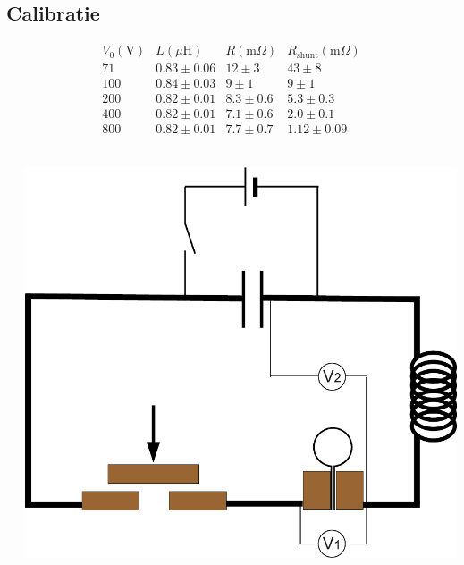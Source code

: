 \documentclass{beamer}
\newcommand{\Rshunt}{R_\mathrm{shunt}}
\newcommand{\includeGraph}[2]{
	\begin{center}
	\scalebox{#1}{
		
	}
	\end{center}
}
\begin{document}
\subsection{Calibratie}
\begin{frame}
\begin{center}
\includeGraph{0.85}{fitI800V}
\end{center}
\end{frame}

\begin{frame}
$$
\begin{array}{c|c|c|c}
V_0 (\mathrm V)&
	L (\mu\mathrm H)&
			R (\mathrm m \Omega)&
				\Rshunt (\mathrm m \Omega)\\\hline
71&	0.83 \pm 0.06&	12 \pm 3&	43 \pm 8\\
100&	0.84 \pm 0.03&	9 \pm 1&	9 \pm 1\\
200&	0.82 \pm 0.01&	8.3 \pm 0.6&	5.3 \pm 0.3\\
400&	0.82 \pm 0.01&	7.1 \pm 0.6&	2.0 \pm 0.1\\
800&	0.82 \pm 0.01&	7.7 \pm 0.7&	1.12 \pm 0.09\\
\end{array}
$$
\includeGraph{0.8}{RshuntPlot}
\end{frame}

\begin{frame}
\begin{columns}[c]
\begin{column}[c]{0.5\textwidth}
\includeGraph{0.7}{Ishunt}
\end{column}
\begin{column}[c]{0.5\textwidth}
\begin{center}
\includegraphics[width=1.0\textwidth]{images/circuit-new-inductance}
\end{center}
\end{column}
\end{columns}
\end{frame}
\end{document}
